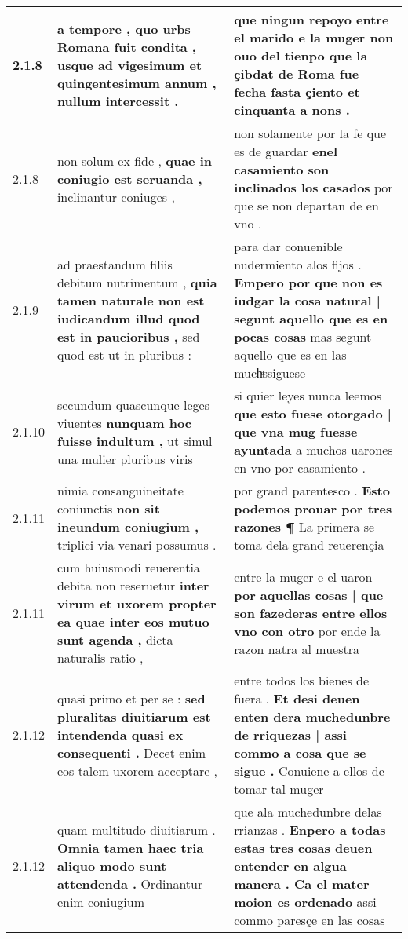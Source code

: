 \begin{tabular}{|p{1cm}|p{6.5cm}|p{6.5cm}|}
2.1.8 & a tempore , \textbf{ quo urbs Romana fuit condita , } usque ad vigesimum et quingentesimum annum , nullum intercessit . & que ningun repoyo entre el marido e la muger non ouo del tienpo \textbf{ que la çibdat de Roma fue fecha } fasta çiento et cinquanta a nons . \\\hline
2.1.8 & non solum ex fide , \textbf{ quae in coniugio est seruanda , } inclinantur coniuges , & non solamente por la fe que es de guardar \textbf{ enel casamiento son inclinados los casados } por que se non departan de en vno . \\\hline
2.1.9 & ad praestandum filiis debitum nutrimentum , \textbf{ quia tamen naturale non est iudicandum illud quod est in paucioribus , } sed quod est ut in pluribus : & para dar conuenible nudermiento alos fijos . \textbf{ Empero por que non es iudgar la cosa natural | segunt aquello que es en pocas cosas } mas segunt aquello que es en las muchͣssiguese \\\hline
2.1.10 & secundum quascunque leges viuentes \textbf{ nunquam hoc fuisse indultum , } ut simul una mulier pluribus viris & si quier leyes nunca leemos \textbf{ que esto fuese otorgado | que vna mug fuesse ayuntada } a muchos uarones en vno por casamiento . \\\hline
2.1.11 & nimia consanguineitate coniunctis \textbf{ non sit ineundum coniugium , } triplici via venari possumus . & por grand parentesco . \textbf{ Esto podemos prouar por tres razones ¶ } La primera se toma dela grand reuerençia \\\hline
2.1.11 & cum huiusmodi reuerentia debita non reseruetur \textbf{ inter virum et uxorem propter ea quae inter eos mutuo sunt agenda , } dicta naturalis ratio , & entre la muger e el uaron \textbf{ por aquellas cosas | que son fazederas entre ellos vno con otro } por ende la razon natra al muestra \\\hline
2.1.12 & quasi primo et per se : \textbf{ sed pluralitas diuitiarum est intendenda quasi ex consequenti . } Decet enim eos talem uxorem acceptare , & entre todos los bienes de fuera . \textbf{ Et desi deuen enten dera muchedunbre de rriquezas | assi commo a cosa que se sigue . } Conuiene a ellos de tomar tal muger \\\hline
2.1.12 & quam multitudo diuitiarum . \textbf{ Omnia tamen haec tria aliquo modo sunt attendenda . } Ordinantur enim coniugium & que ala muchedunbre delas rrianzas . \textbf{ Enpero a todas estas tres cosas deuen entender en algua manera . Ca el mater moion es ordenado } assi commo paresçe en las cosas \\\hline

\end{tabular}

